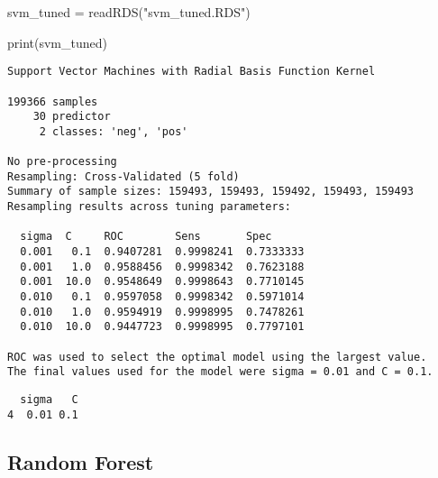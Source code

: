 \documentclass[
  11pt,
  letterpaper,
  DIV=11,
  numbers=noendperiod]{scrartcl}
\newenvironment{Shaded}{}{}
\newcommand{\CommentTok}[1]{\textcolor[rgb]{0.42,0.45,0.49}{#1}}
\newcommand{\FunctionTok}[1]{\textcolor[rgb]{0.44,0.26,0.76}{#1}}
\newcommand{\NormalTok}[1]{\textcolor[rgb]{0.14,0.16,0.18}{#1}}
\newcommand{\OtherTok}[1]{\textcolor[rgb]{0.44,0.26,0.76}{#1}}
\newcommand{\SpecialCharTok}[1]{\textcolor[rgb]{0.00,0.36,0.77}{#1}}
\newcommand{\StringTok}[1]{\textcolor[rgb]{0.01,0.18,0.38}{#1}}
\begin{document}
\begin{Shaded}
\begin{Highlighting}[]
\NormalTok{svm\_tuned }\OtherTok{=} \FunctionTok{readRDS}\NormalTok{(}\StringTok{"svm\_tuned.RDS"}\NormalTok{)}


\FunctionTok{print}\NormalTok{(svm\_tuned)}
\end{Highlighting}
\end{Shaded}

\begin{verbatim}
Support Vector Machines with Radial Basis Function Kernel 

199366 samples
    30 predictor
     2 classes: 'neg', 'pos' 

No pre-processing
Resampling: Cross-Validated (5 fold) 
Summary of sample sizes: 159493, 159493, 159492, 159493, 159493 
Resampling results across tuning parameters:

  sigma  C     ROC        Sens       Spec     
  0.001   0.1  0.9407281  0.9998241  0.7333333
  0.001   1.0  0.9588456  0.9998342  0.7623188
  0.001  10.0  0.9548649  0.9998643  0.7710145
  0.010   0.1  0.9597058  0.9998342  0.5971014
  0.010   1.0  0.9594919  0.9998995  0.7478261
  0.010  10.0  0.9447723  0.9998995  0.7797101

ROC was used to select the optimal model using the largest value.
The final values used for the model were sigma = 0.01 and C = 0.1.
\end{verbatim}

\begin{Shaded}
\end{Shaded}

\begin{verbatim}
  sigma   C
4  0.01 0.1
\end{verbatim}

\subsection{Random Forest}\label{random-forest}
\end{document}
